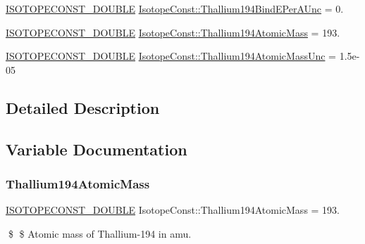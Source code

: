\begin{DoxyCompactItemize}
\mbox{\hyperlink{group___isotope_const-_macros_ga8f45a7272ce02c0b4c65c44636ed719a}{I\+S\+O\+T\+O\+P\+E\+C\+O\+N\+S\+T\+\_\+\+D\+O\+U\+B\+LE}} \mbox{\hyperlink{group___isotope_const-_thallium-_tl194_ga5881c0fb8a5f4da31260bf826301392c}{Isotope\+Const\+::\+Thallium194\+Bind\+E\+Per\+A\+Unc}} = 0.
\item 
\mbox{\hyperlink{group___isotope_const-_macros_ga8f45a7272ce02c0b4c65c44636ed719a}{I\+S\+O\+T\+O\+P\+E\+C\+O\+N\+S\+T\+\_\+\+D\+O\+U\+B\+LE}} \mbox{\hyperlink{group___isotope_const-_thallium-_tl194_gae92b54b070bfe0c58e690b124c86fad8}{Isotope\+Const\+::\+Thallium194\+Atomic\+Mass}} = 193.
\item 
\mbox{\hyperlink{group___isotope_const-_macros_ga8f45a7272ce02c0b4c65c44636ed719a}{I\+S\+O\+T\+O\+P\+E\+C\+O\+N\+S\+T\+\_\+\+D\+O\+U\+B\+LE}} \mbox{\hyperlink{group___isotope_const-_thallium-_tl194_ga5e7af8102b2f89c4247ed96f85163029}{Isotope\+Const\+::\+Thallium194\+Atomic\+Mass\+Unc}} = 1.\+5e-\/05
\end{DoxyCompactItemize}


\subsection{Detailed Description}


\subsection{Variable Documentation}
\mbox{\label{group___isotope_const-_thallium-_tl194_gae92b54b070bfe0c58e690b124c86fad8}} 
\subsubsection{\texorpdfstring{Thallium194\+Atomic\+Mass}{Thallium194AtomicMass}}
{\footnotesize\ttfamily \mbox{\hyperlink{group___isotope_const-_macros_ga8f45a7272ce02c0b4c65c44636ed719a}{I\+S\+O\+T\+O\+P\+E\+C\+O\+N\+S\+T\+\_\+\+D\+O\+U\+B\+LE}} Isotope\+Const\+::\+Thallium194\+Atomic\+Mass = 193.}

\$ \$ Atomic mass of Thallium-\/194 in amu. \mbox{\label{group___isotope_const-_thallium-_tl194_ga5e7af8102b2f89c4247ed96f85163029}} 
